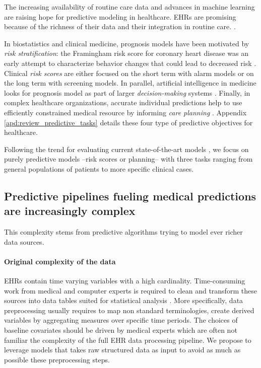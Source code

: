 \documentclass[french,12pt,twoside,a4paper]{book}
\begin{document}
The increasing availability of routine care data and advances in machine
learning are raising hope for predictive modeling in healthcare. EHRs are
promising because of the richness of their data and their integration in routine
care. \citep{raghupathi2014big}.

In biostatistics and clinical medicine, prognosis models have been motivated by
\emph{risk stratification}: the Framingham risk score for coronary heart disease
was an early attempt to characterize behavior changes that could lead to
decreased risk \citep{brand1976multivariate}. Clinical \emph{risk scores} are
either focused on the short term with alarm models
\citep{tang2007global,rothman2013development,wong2021external} or on the long
term with screening models. In parallel, artificial intelligence in medicine
looks for prognosis model as part of larger \emph{decision-making} systems
\citep{Szolovits1982artificial}. Finally, in complex healthcare organizations, accurate
individual predictions help to use efficiently constrained medical resource by
informing \emph{care planning} \citep{topol2019high}. Appendix
\ref{apd:review_predictive_tasks} details these four type of predictive objectives for
healthcare.

Following the trend for evaluating current state-of-the-art models
\citep{wornow2023shaky}, we focus on purely predictive models --risk scores or
planning-- with three tasks ranging from general populations of patients to
more specific clinical cases.

\subsection{Predictive pipelines fueling medical predictions are increasingly
  complex}%
\label{subsec:predictive_models:complex_data}%

This complexity stems from predictive algorithms trying to model ever richer data
sources.

\paragraph{Original complexity of the data}

EHRs contain time varying variables with a high cardinality. Time-consuming work
from medical and computer experts is required to clean and transform these
sources into data tables suited for statistical analysis
\citep{bacry2020scalpel3,hripcsak2015observational}. More specifically, data
preprocessing usually requires to map non standard terminologies, create derived
variables by aggregating measures over specific time periods. The choices of
baseline covariates should be driven by medical experts which are often not
familiar the complexity of the full EHR data processing pipeline. We propose to
leverage models that takes raw structured data as input to avoid as much as possible these
preprocessing steps.
\end{document}
